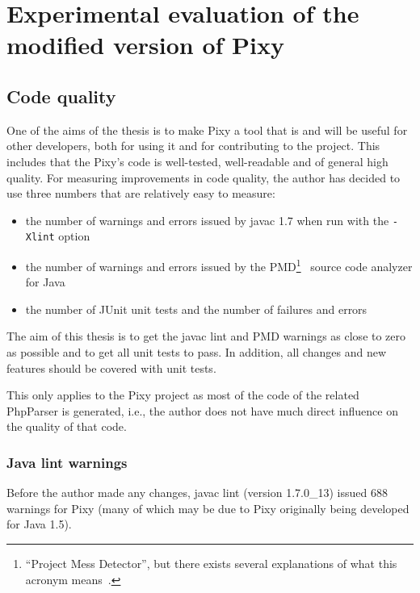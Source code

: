 \chapter{Experimental evaluation of the modified version of Pixy}

\section{Code quality}
\label{code-quality}
One of the aims of the thesis is to make Pixy a tool that is and will be useful for other developers, both for using it and for contributing to the project. This includes that the Pixy's code is well-tested, well-readable and of general high quality. For measuring improvements in code quality, the author has decided to use three numbers that are relatively easy to measure:

\begin{itemize}
  \item the number of warnings and errors issued by javac 1.7 when run with the \texttt{-Xlint} option
  \item the number of warnings and errors issued by the PMD\footnote{``Project Mess Detector'', but there exists several explanations of what this acronym means~\cite{pmd-meaning}.}~\cite{pmd} source code analyzer for Java
  \item the number of JUnit unit tests and the number of failures and errors
\end{itemize}

The aim of this thesis is to get the javac lint and PMD warnings as close to zero as possible and to get all unit tests to pass. In addition, all changes and new features should be covered with unit tests.

This only applies to the Pixy project as most of the code of the related PhpParser is generated, i.e., the author does not have much direct influence on the quality of that code.

\subsection{Java lint warnings}

Before the author made any changes, javac lint (version 1.7.0\_13) issued 688 warnings for Pixy (many of which may be due to Pixy originally being developed for Java 1.5).

